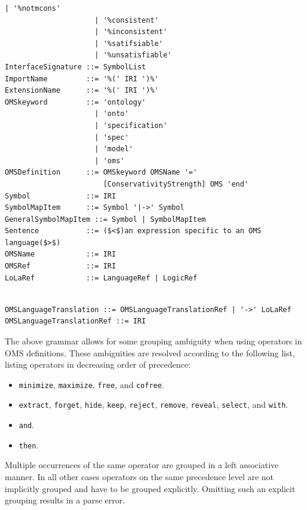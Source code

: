 \documentclass[10pt,fleqn,final]{scrreprt}
\newcommand*{\syntax}[1]{\texttt{#1}}
\newenvironment{definitions}[0]{\medskip }{}
\begin{document}
\begin{definitions}
\begin{lstlisting}[language=ebnf,escapeinside={()},mathescape]
                     | '%notmcons'
                     | '%consistent'
                     | '%inconsistent'
                     | '%satifsiable'
                     | '%unsatisfiable'
InterfaceSignature ::= SymbolList
ImportName         ::= '%(' IRI ')%'
ExtensionName      ::= '%(' IRI ')%'
OMSkeyword         ::= 'ontology'
                     | 'onto'
                     | 'specification'
                     | 'spec'
                     | 'model'
                     | 'oms'
OMSDefinition      ::= OMSkeyword OMSName '='
                       [ConservativityStrength] OMS 'end'
Symbol             ::= IRI
SymbolMapItem      ::= Symbol '|->' Symbol
GeneralSymbolMapItem ::= Symbol | SymbolMapItem
Sentence           ::= ($<$)an expression specific to an OMS language($>$) 
OMSName            ::= IRI
OMSRef             ::= IRI
LoLaRef            ::= LanguageRef | LogicRef
\end{lstlisting}


\begin{lstlisting}[language=ebnf,mathescape]

OMSLanguageTranslation ::= OMSLanguageTranslationRef | '->' LoLaRef
OMSLanguageTranslationRef ::= IRI
\end{lstlisting}



The above grammar allows for some grouping ambiguity when using operators in
OMS definitions. These ambiguities are resolved according to the following
list, listing operators in decreasing order of precedence:
\begin{itemize}
  \item \syntax{minimize}, \syntax{maximize}, \syntax{free}, and \syntax{cofree}. 
  \item \syntax{extract}, \syntax{forget}, \syntax{hide}, \syntax{keep},
    \syntax{reject}, \syntax{remove}, \syntax{reveal}, \syntax{select}, and
    \syntax{with}.
  \item \syntax{and}.
  \item \syntax{then}.
\end{itemize}
Multiple occurrences of the same operator are grouped in a left associative
manner. In all other cases operators on the same precedence level are not
implicitly grouped and have to be grouped explicitly. Omitting such an explicit
grouping results in a parse error.



\end{definitions}
\end{document}

